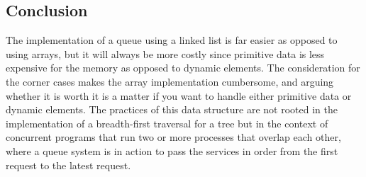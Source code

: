 \documentclass[a4paper,11pt]{article}
\begin{document}
    \subsection*{Conclusion}

        The implementation of a queue using a linked list is far easier as opposed to using arrays, but it will always be more costly since primitive data is less expensive for the memory as opposed to dynamic elements. The consideration for the corner cases makes the array implementation cumbersome, and arguing whether it is worth it is a matter if you want to handle either primitive data or dynamic elements. The practices of this data structure are not rooted in the implementation of a breadth-first traversal for a tree but in the context of concurrent programs that run two or more processes that overlap each other, where a queue system is in action to pass the services in order from the first request to the latest request.
        
    
\end{document}
